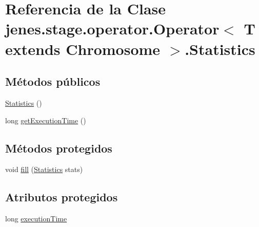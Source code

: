 \hypertarget{classjenes_1_1stage_1_1operator_1_1_operator_3_01_t_01extends_01_chromosome_01_4_1_1_statistics}{\section{Referencia de la Clase jenes.\-stage.\-operator.\-Operator$<$ T extends Chromosome $>$.Statistics}
\label{classjenes_1_1stage_1_1operator_1_1_operator_3_01_t_01extends_01_chromosome_01_4_1_1_statistics}
}
\subsection*{Métodos públicos}
\begin{DoxyCompactItemize}
\item 
\hyperlink{classjenes_1_1stage_1_1operator_1_1_operator_3_01_t_01extends_01_chromosome_01_4_1_1_statistics_adaa59a7b449045b5fd3c9abd3fbecf23}{Statistics} ()
\item 
long \hyperlink{classjenes_1_1stage_1_1operator_1_1_operator_3_01_t_01extends_01_chromosome_01_4_1_1_statistics_a7ad4b3ece9b2cdbf4a9142eda087a12d}{get\-Execution\-Time} ()
\end{DoxyCompactItemize}
\subsection*{Métodos protegidos}
\begin{DoxyCompactItemize}
\item 
void \hyperlink{classjenes_1_1stage_1_1operator_1_1_operator_3_01_t_01extends_01_chromosome_01_4_1_1_statistics_a26f2fb7bb11b9d05d95705ec95f470cf}{fill} (\hyperlink{classjenes_1_1stage_1_1operator_1_1_operator_3_01_t_01extends_01_chromosome_01_4_1_1_statistics_adaa59a7b449045b5fd3c9abd3fbecf23}{Statistics} stats)
\end{DoxyCompactItemize}
\subsection*{Atributos protegidos}
\begin{DoxyCompactItemize}
\item 
long \hyperlink{classjenes_1_1stage_1_1operator_1_1_operator_3_01_t_01extends_01_chromosome_01_4_1_1_statistics_a3e7fc955df9ca708795c24336b12f937}{execution\-Time}
\end{DoxyCompactItemize}


